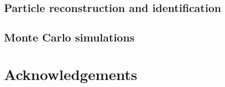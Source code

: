 \subsection{Particle reconstruction and identification}
\label{ssec:cms:recoandid}


\subsection{Monte Carlo simulations}
\label{ssec:cms:montecarlo}


\section{Acknowledgements}
\label{sec:hardware:acknowledgements}

